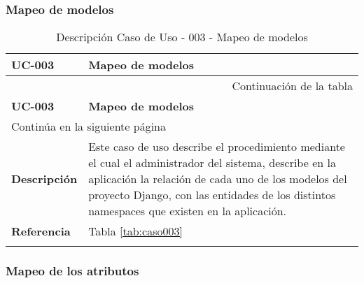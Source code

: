 \subsubsection{Mapeo de modelos}

\begin{center}
\begin{longtable}{||p{3.4cm}|p{12cm}||}
 \hline \hline \bf UC-003 &  \bf Mapeo de modelos \\
\hline
\endfirsthead
\hline \multicolumn{2}{|r|}{{Continuación de la tabla}} \\ \hline
 \hline \bf UC-003 &  \bf Mapeo de modelos \\
\hline
\endhead
\hline \multicolumn{2}{|l|}{{Continúa en la siguiente página}} \\ \hline
\endfoot
\endlastfoot
 \hline \bf Descripción & Este caso de uso describe el procedimiento mediante
             el cual el administrador del sistema, describe en la aplicación la
             relación de cada uno de los modelos del proyecto Django, con las
             entidades de los distintos namespaces que existen en la
             aplicación.\\
 \hline \bf Referencia & Tabla \ref{tab:caso003}\\
\hline
\hline
\caption{\label{tab:caso003-red} Descripción Caso de Uso - 003 - Mapeo de \mbox{modelos}} 
\end{longtable}
\end{center}


\subsubsection{Mapeo de los atributos}

